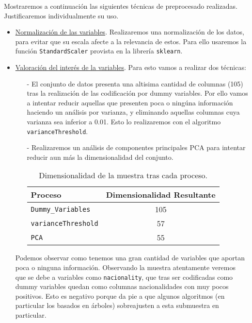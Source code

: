 \documentclass[11pt,a4paper]{article}
\begin{document}
Mostraremos a continuación las siguientes técnicas de preprocesado realizadas. Justificaremos individualmente su uso.

\begin{itemize}

	\item \underline{Normalización de las variables}. Realizaremos una normalización de los datos, para evitar que su escala afecte a la relevancia de estos. Para ello usaremos la función \texttt{StandardScaler}\cite{standardscaler} provista en la librería \texttt{sklearn}.
		\item \underline{Valoración del interés de la variables}. Para esto vamos a realizar dos técnicas:
	
	\begin{itemize}
	\item[-] El conjunto de datos presenta una altisima cantidad de columnas (105) tras la realización de las codificación por dummy variables. Por ello vamos a intentar reducir aquellas que presenten poca o ningúna información haciendo un análisis por varianza, y eliminando aquellas columnas cuya varianza sea inferior a 0.01. Esto lo realizaremos con el algoritmo \texttt{varianceThreshold}\cite{einstein}.
	
	\item[-] Realizaremos un análisis de componentes principales PCA\cite{PCA} para intentar reducir aun más la dimensionalidad del conjunto. 


		
\begin{table}[h]
\begin{center}
\begin{tabular}{|l|c|}
\hline
 Proceso & Dimensionalidad Resultante \\ \hline
 \texttt{Dummy\_Variables} &  105\\
\texttt{varianceThreshold} &57 \\
\texttt{PCA} & 55 \\\hline
\end{tabular}
\end{center}
\caption{Dimensionalidad de la muestra tras cada proceso.}
	\end{table}

\end{itemize}

Podemos observar como tenemos una gran cantidad de variables que aportan poca o ninguna información. Observando la muestra atentamente veremos que se debe a variables como \texttt{nacionality}, que tras ser codificadas como dummy variables quedan como columnas nacionalidades con muy pocos positivos. Esto es negativo porque da pie a que algunos algoritmos (en particular los basados en árboles) sobreajusten a esta submuestra en particular. 


\end{itemize}
\end{document}

